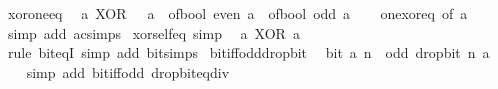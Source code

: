 \begin{isabellebody}
\endisatagproof
{\isafoldproof}%
%
\isadelimproof
\isanewline
%
\endisadelimproof
\isanewline
{}\isamarkupfalse%
\ xor{\isacharunderscore}{\kern0pt}one{\isacharunderscore}{\kern0pt}eq{\isacharcolon}{\kern0pt}\isanewline
\ \ {\isacartoucheopen}a\ XOR\ {}\ {\isacharequal}{\kern0pt}\ a\ {\isacharplus}{\kern0pt}\ of{\isacharunderscore}{\kern0pt}bool\ {\isacharparenleft}{\kern0pt}even\ a{\isacharparenright}{\kern0pt}\ {\isacharminus}{\kern0pt}\ of{\isacharunderscore}{\kern0pt}bool\ {\isacharparenleft}{\kern0pt}odd\ a{\isacharparenright}{\kern0pt}{\isacartoucheclose}\isanewline
%
\isadelimproof
\ \ %
\endisadelimproof
%
\isatagproof
{}\isamarkupfalse%
\ one{\isacharunderscore}{\kern0pt}xor{\isacharunderscore}{\kern0pt}eq\ {\isacharbrackleft}{\kern0pt}of\ a{\isacharbrackright}{\kern0pt}\ \isamarkupfalse%
\ {\isacharparenleft}{\kern0pt}simp\ add{\isacharcolon}{\kern0pt}\ ac{\isacharunderscore}{\kern0pt}simps{\isacharparenright}{\kern0pt}%
\endisatagproof
{\isafoldproof}%
%
\isadelimproof
\isanewline
%
\endisadelimproof
\isanewline
{}\isamarkupfalse%
\ xor{\isacharunderscore}{\kern0pt}self{\isacharunderscore}{\kern0pt}eq\ {\isacharbrackleft}{\kern0pt}simp{\isacharbrackright}{\kern0pt}{\isacharcolon}{\kern0pt}\isanewline
\ \ {\isacartoucheopen}a\ XOR\ a\ {\isacharequal}{\kern0pt}\ {}{\isacartoucheclose}\isanewline
%
\isadelimproof
\ \ %
\endisadelimproof
%
\isatagproof
{}\isamarkupfalse%
\ {\isacharparenleft}{\kern0pt}rule\ bit{\isacharunderscore}{\kern0pt}eqI{\isacharparenright}{\kern0pt}\ {\isacharparenleft}{\kern0pt}simp\ add{\isacharcolon}{\kern0pt}\ bit{\isacharunderscore}{\kern0pt}simps{\isacharparenright}{\kern0pt}%
\endisatagproof
{\isafoldproof}%
%
\isadelimproof
\isanewline
%
\endisadelimproof
\isanewline
{}\isamarkupfalse%
\ bit{\isacharunderscore}{\kern0pt}iff{\isacharunderscore}{\kern0pt}odd{\isacharunderscore}{\kern0pt}drop{\isacharunderscore}{\kern0pt}bit{\isacharcolon}{\kern0pt}\isanewline
\ \ {\isacartoucheopen}bit\ a\ n\ {\isasymlongleftrightarrow}\ odd\ {\isacharparenleft}{\kern0pt}drop{\isacharunderscore}{\kern0pt}bit\ n\ a{\isacharparenright}{\kern0pt}{\isacartoucheclose}\isanewline
%
\isadelimproof
\ \ %
\endisadelimproof
%
\isatagproof
{}\isamarkupfalse%
\ {\isacharparenleft}{\kern0pt}simp\ add{\isacharcolon}{\kern0pt}\ bit{\isacharunderscore}{\kern0pt}iff{\isacharunderscore}{\kern0pt}odd\ drop{\isacharunderscore}{\kern0pt}bit{\isacharunderscore}{\kern0pt}eq{\isacharunderscore}{\kern0pt}div{\isacharparenright}{\kern0pt}%

\end{isabellebody}
